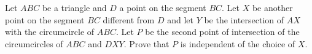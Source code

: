 Let $ABC$ be a triangle and $D$ a point on the segment $BC$.
Let $X$ be another point on the segment $BC$ different from $D$ and let $Y$ be the intersection
of $AX$ with the circumcircle of $ABC$. Let $P$ be the second point of intersection of
the circumcircles of $ABC$ and $DXY$. Prove that $P$ is independent of the choice of $X$.